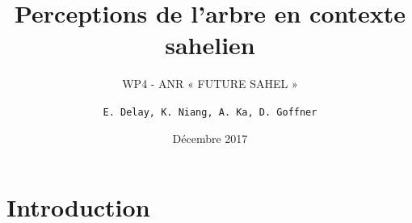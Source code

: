 \documentclass[newPxFont]{beamer}
\title{Perceptions de l’arbre en contexte sahelien}
\subtitle{WP4 - ANR « FUTURE SAHEL »}
\date{Décembre 2017}
\author{\texttt{E. Delay, K. Niang, A. Ka, D. Goffner}}
\institute{OHMi Téssékéré - UMI 3189 CNRS}
\begin{document}
%
%

\maketitle


%
%


\section{Introduction}
\end{document}
